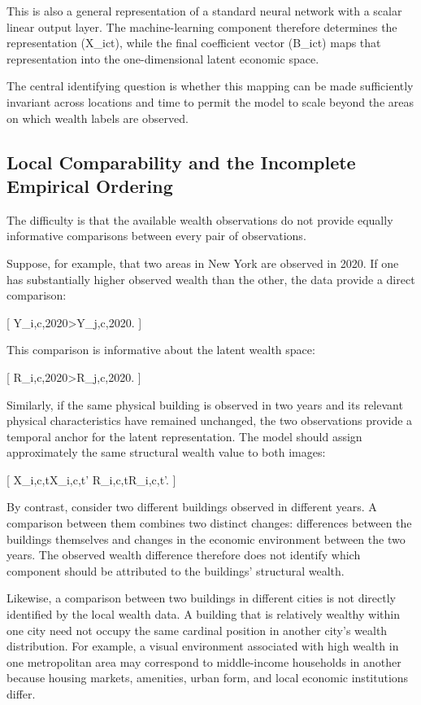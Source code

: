 This is also a general representation of a standard neural network with a scalar linear output layer. The machine-learning component therefore determines the representation (X_{ict}), while the final coefficient vector (B_{ict}) maps that representation into the one-dimensional latent economic space.

The central identifying question is whether this mapping can be made sufficiently invariant across locations and time to permit the model to scale beyond the areas on which wealth labels are observed.

\subsection{Local Comparability and the Incomplete Empirical Ordering}

The difficulty is that the available wealth observations do not provide equally informative comparisons between every pair of observations.

Suppose, for example, that two areas in New York are observed in 2020. If one has substantially higher observed wealth than the other, the data provide a direct comparison:

[
Y_{i,c,2020}>Y_{j,c,2020}.
]

This comparison is informative about the latent wealth space:

[
R_{i,c,2020}>R_{j,c,2020}.
]

Similarly, if the same physical building is observed in two years and its relevant physical characteristics have remained unchanged, the two observations provide a temporal anchor for the latent representation. The model should assign approximately the same structural wealth value to both images:

[
X_{i,c,t}\simeq X_{i,c,t'}
\quad\Longrightarrow\quad
R_{i,c,t}\simeq R_{i,c,t'}.
]

By contrast, consider two different buildings observed in different years. A comparison between them combines two distinct changes: differences between the buildings themselves and changes in the economic environment between the two years. The observed wealth difference therefore does not identify which component should be attributed to the buildings' structural wealth.

Likewise, a comparison between two buildings in different cities is not directly identified by the local wealth data. A building that is relatively wealthy within one city need not occupy the same cardinal position in another city's wealth distribution. For example, a visual environment associated with high wealth in one metropolitan area may correspond to middle-income households in another because housing markets, amenities, urban form, and local economic institutions differ.


